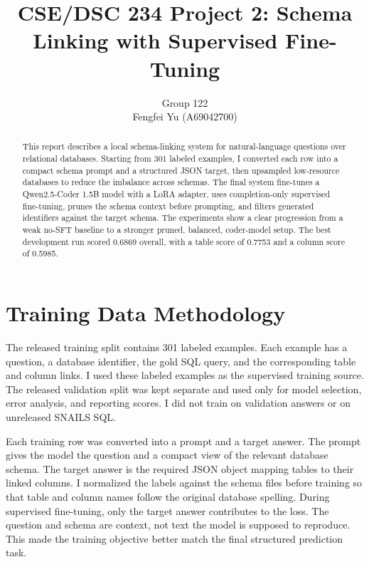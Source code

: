 \documentclass{article}
\title{CSE/DSC 234 Project 2: Schema Linking with Supervised Fine-Tuning}
\author{Group 122 \\ Fengfei Yu (A69042700)}
\begin{document}
\maketitle

\begin{abstract}
This report describes a local schema-linking system for natural-language questions over relational
databases. Starting from 301 labeled examples, I converted each row into a compact schema prompt
and a structured JSON target, then upsampled low-resource databases to reduce the imbalance across
schemas. The final system fine-tunes a Qwen2.5-Coder 1.5B model with a LoRA adapter, uses
completion-only supervised fine-tuning, prunes the schema context before prompting, and filters
generated identifiers against the target schema. The experiments show a clear progression from a
weak no-SFT baseline to a stronger pruned, balanced, coder-model setup. The best development run
scored 0.6869 overall, with a table score of 0.7753 and a column score of 0.5985.
\end{abstract}

\section{Training Data Methodology}

The released training split contains 301 labeled examples. Each example has a question, a database
identifier, the gold SQL query, and the corresponding table and column links. I used these labeled
examples as the supervised training source. The released validation split was kept separate and used
only for model selection, error analysis, and reporting scores. I did not train on validation answers
or on unreleased SNAILS SQL.

Each training row was converted into a prompt and a target answer. The prompt gives the model the
question and a compact view of the relevant database schema. The target answer is the required JSON
object mapping tables to their linked columns. I normalized the labels against the schema files before
training so that table and column names follow the original database spelling. During supervised
fine-tuning, only the target answer contributes to the loss. The question and schema are context, not
text the model is supposed to reproduce. This made the training objective better match the final
structured prediction task.
\end{document}
